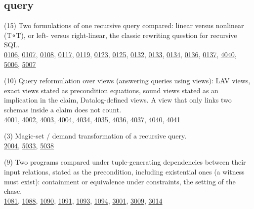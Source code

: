 \documentclass[10pt]{article}
\begin{document}
\subsection*{query}
\begin{description}[leftmargin=1.2em,itemsep=2pt]
\item[\texttt{linear-vs-nonlinear}\label{tag:linear-vs-nonlinear}] (15) Two formulations of one recursive query compared: linear versus nonlinear (T∘T), or left- versus right-linear, the classic rewriting question for recursive SQL.\\ {\small \hyperref[case:Example0106]{0106}, \hyperref[case:Example0107]{0107}, \hyperref[case:Example0108]{0108}, \hyperref[case:Example0117]{0117}, \hyperref[case:Example0119]{0119}, \hyperref[case:Example0123]{0123}, \hyperref[case:Example0125]{0125}, \hyperref[case:Example0132]{0132}, \hyperref[case:Example0133]{0133}, \hyperref[case:Example0134]{0134}, \hyperref[case:Example0136]{0136}, \hyperref[case:Example0137]{0137}, \hyperref[case:Example4040]{4040}, \hyperref[case:Example5006]{5006}, \hyperref[case:Example5007]{5007}}
\item[\texttt{views}\label{tag:views}] (10) Query reformulation over views (answering queries using views): LAV views, exact views stated as precondition equations, sound views stated as an implication in the claim, Datalog-defined views. A view that only links two schemas inside a claim does not count.\\ {\small \hyperref[case:Example4001]{4001}, \hyperref[case:Example4002]{4002}, \hyperref[case:Example4003]{4003}, \hyperref[case:Example4004]{4004}, \hyperref[case:Example4034]{4034}, \hyperref[case:Example4035]{4035}, \hyperref[case:Example4036]{4036}, \hyperref[case:Example4037]{4037}, \hyperref[case:Example4040]{4040}, \hyperref[case:Example4041]{4041}}
\item[\texttt{magic-sets}\label{tag:magic-sets}] (3) Magic-set / demand transformation of a recursive query.\\ {\small \hyperref[case:Example2004]{2004}, \hyperref[case:Example5033]{5033}, \hyperref[case:Example5038]{5038}}
\item[\texttt{dependencies}\label{tag:dependencies}] (9) Two programs compared under tuple-generating dependencies between their input relations, stated as the precondition, including existential ones (a witness must exist): containment or equivalence under constraints, the setting of the chase.\\ {\small \hyperref[case:Example1081]{1081}, \hyperref[case:Example1088]{1088}, \hyperref[case:Example1090]{1090}, \hyperref[case:Example1091]{1091}, \hyperref[case:Example1093]{1093}, \hyperref[case:Example1094]{1094}, \hyperref[case:Example3001]{3001}, \hyperref[case:Example3009]{3009}, \hyperref[case:Example3014]{3014}}

\end{description}
\end{document}
